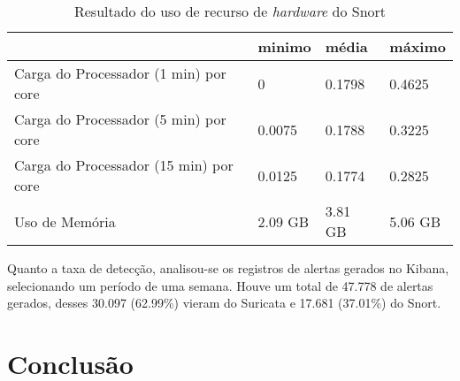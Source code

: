 \begin{table}[htb]
\ABNTEXfontereduzida
\centering
\caption{Resultado do uso de recurso de \textit{hardware} do Snort}
\label{tab:snort-recursos}
\begin{tabular}{|M{5cm}|M{2cm}|M{2cm}|M{2cm}|}
    \hline
     & \textbf{minimo} & \textbf{média} & \textbf{máximo} \\
    \hline
    Carga do Processador (1 min) por core & 0 & 0.1798 & 0.4625 \\
    \hline
    Carga do Processador (5 min) por core & 0.0075 & 0.1788 & 0.3225 \\
    \hline
    Carga do Processador (15 min) por core & 0.0125 & 0.1774 & 0.2825 \\
    \hline
    Uso de Memória & 2.09 GB & 3.81 GB & 5.06 GB \\
    \hline
\end{tabular}
\end{table}

Quanto a taxa de detecção, analisou-se os registros de alertas gerados no Kibana, selecionando um período de uma semana. Houve um total de 47.778 de alertas gerados, desses 30.097 (62.99\%) vieram do Suricata e 17.681 (37.01\%) do Snort.

\section{Conclusão} \label{sec:conclusão}
